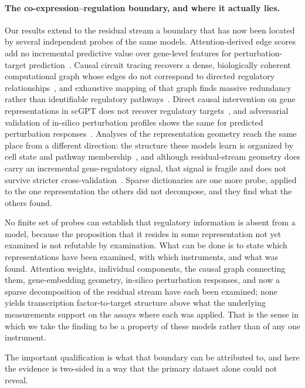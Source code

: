 \paragraph{The co-expression--regulation boundary, and where it actually lies.}
Our results extend to the residual stream a boundary that has now been located by several
independent probes of the same models. Attention-derived edge scores add no incremental predictive
value over gene-level features for perturbation-target prediction~\cite{kendiukhov2025systematic}.
Causal circuit tracing recovers a dense, biologically coherent computational graph whose edges do
not correspond to directed regulatory relationships~\cite{kendiukhov2026circuittracing}, and
exhaustive mapping of that graph finds massive redundancy rather than identifiable regulatory
pathways~\cite{kendiukhov2026exhaustive}. Direct causal intervention on gene representations in
scGPT does not recover regulatory targets~\cite{kendiukhov2026causalintervention}, and adversarial
validation of in-silico perturbation profiles shows the same for predicted perturbation
responses~\cite{kendiukhov2026insilico}. Analyses of the representation geometry reach the same
place from a different direction: the structure these models learn is organized by cell state and
pathway membership~\cite{kendiukhov2026topology,kendiukhov2026celltypeprograms}, and although
residual-stream geometry does carry an incremental gene-regulatory signal, that signal is fragile
and does not survive stricter cross-validation~\cite{kendiukhov2026grsgeometry}. Sparse
dictionaries are one more probe, applied to the one representation the others did not decompose,
and they find what the others found.

No finite set of probes can establish that regulatory information is absent from a model, because
the proposition that it resides in some representation not yet examined is not refutable by
examination. What can be done is to state which representations have been examined, with which
instruments, and what was found. Attention weights, individual components, the causal graph
connecting them, gene-embedding geometry, in-silico perturbation responses, and now a sparse
decomposition of the residual stream have each been examined; none yields transcription
factor-to-target structure above what the underlying measurements support on the assays where each
was applied. That is the sense in
which we take the finding to be a property of these models rather than of any one instrument.

The important qualification is what that boundary can be attributed to, and here the evidence is
two-sided in a way that the primary dataset alone could not reveal.

